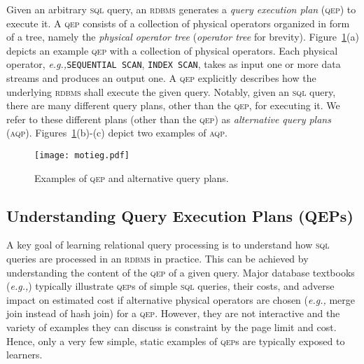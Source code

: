 \documentclass[11pt]{article}
\newcommand{\eg}{\emph{e.g.,}\xspace}
\begin{document}
Given an arbitrary \textsc{sql} query, an \textsc{rdbms} generates a \textit{query execution plan} (\textsc{qep}) to execute it.  A \textsc{qep}  consists of a collection of physical operators organized in form of a tree, namely the \textit{physical operator tree} (\textit{operator tree} for brevity). Figure~\ref{fig:alter_plans}(a) depicts an example \textsc{qep} with a collection of physical operators. Each physical operator, \eg \texttt{SEQUENTIAL SCAN}, \texttt{INDEX SCAN}, takes as input one or more data streams and produces an output one. A \textsc{qep} explicitly describes how the underlying \textsc{rdbms} shall execute the given query. Notably, given an \textsc{sql} query, there are many different query plans, other than the \textsc{qep}, for executing it.  We refer to these different plans (other than the \textsc{qep}) as \textit{alternative query plans} (\textsc{aqp}).  Figures~\ref{fig:alter_plans}(b)-(c) depict two examples of \textsc{aqp}. 
 
 
 \begin{figure}[t]
	\centering
	\texttt{[image: motieg.pdf]}
	\vspace{0ex}\caption{Examples of \textsc{qep} and alternative query plans.}
	\label{fig:alter_plans}
	\vspace{0ex} \end{figure}

\subsection{Understanding Query Execution Plans (QEPs)} \label{sec:nlg}
A key goal of learning relational query processing is to understand  how \textsc{sql} queries are processed in an \textsc{rdbms} in practice. This can be achieved by understanding the content of the \textsc{qep} of a given query.  Major database textbooks (\eg \cite{dbtext,cow})  typically illustrate \textsc{qep}s of simple \textsc{sql} queries, their costs, and  adverse impact on estimated cost if alternative physical operators are chosen (\eg merge join instead of hash join) for a \textsc{qep}. However, they are not interactive and the variety of examples they can discuss is constraint by the page limit and cost. Hence, only a very few simple, static examples of \textsc{qep}s are typically exposed to learners.
\end{document}
